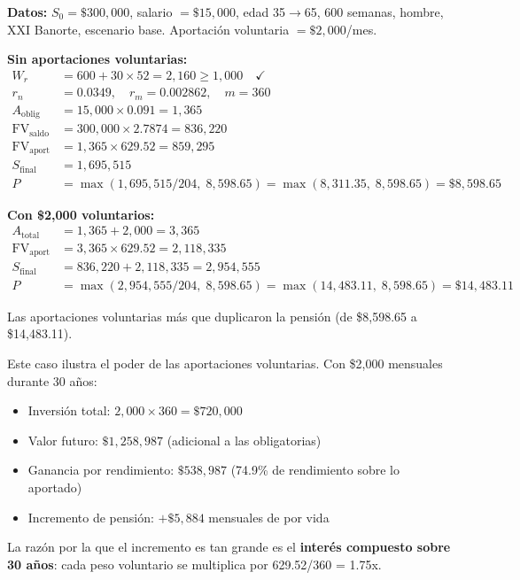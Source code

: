 \documentclass[11pt,a4paper]{report}
\theoremstyle{remark}
\DeclareMathOperator{\FV}{FV}
\begin{document}
\begin{tcolorbox}[colback=blue!5!white, colframe=blue!75!black, title=\textbf{Definici\'on Formal}]
\textbf{Datos:} $S_0 = \$300{,}000$, salario $= \$15{,}000$, edad 35$\to$65, 600 semanas, hombre, XXI Banorte, escenario base. Aportaci\'on voluntaria $= \$2{,}000$/mes.

\textbf{Sin aportaciones voluntarias:}
\begin{align}
W_r &= 600 + 30 \times 52 = 2{,}160 \geq 1{,}000 \quad \checkmark \\
r_n &= 0.0349, \quad r_m = 0.002862, \quad m = 360 \\
A_{\text{oblig}} &= 15{,}000 \times 0.091 = 1{,}365 \\
\FV_{\text{saldo}} &= 300{,}000 \times 2.7874 = 836{,}220 \\
\FV_{\text{aport}} &= 1{,}365 \times 629.52 = 859{,}295 \\
S_{\text{final}} &= 1{,}695{,}515 \\
P &= \max(1{,}695{,}515 / 204, \; 8{,}598.65) = \max(8{,}311.35, \; 8{,}598.65) = \$8{,}598.65
\end{align}

\textbf{Con \$2,000 voluntarios:}
\begin{align}
A_{\text{total}} &= 1{,}365 + 2{,}000 = 3{,}365 \\
\FV_{\text{aport}} &= 3{,}365 \times 629.52 = 2{,}118{,}335 \\
S_{\text{final}} &= 836{,}220 + 2{,}118{,}335 = 2{,}954{,}555 \\
P &= \max(2{,}954{,}555 / 204, \; 8{,}598.65) = \max(14{,}483.11, \; 8{,}598.65) = \boxed{\$14{,}483.11}
\end{align}

Las aportaciones voluntarias m\'as que duplicaron la pensi\'on (de \$8,598.65 a \$14,483.11).
\end{tcolorbox}

\begin{tcolorbox}[colback=green!5!white, colframe=green!50!black, title=\textbf{Intuici\'on}]
Este caso ilustra el poder de las aportaciones voluntarias. Con \$2,000 mensuales durante 30 a\~nos:
\begin{itemize}
  \item Inversi\'on total: $2{,}000 \times 360 = \$720{,}000$
  \item Valor futuro: $\$1{,}258{,}987$ (adicional a las obligatorias)
  \item Ganancia por rendimiento: $\$538{,}987$ (74.9\% de rendimiento sobre lo aportado)
  \item Incremento de pensi\'on: $+\$5{,}884$ mensuales de por vida
\end{itemize}

La raz\'on por la que el incremento es tan grande es el \textbf{inter\'es compuesto sobre 30 a\~nos}: cada peso voluntario se multiplica por 629.52/360 = 1.75x.
\end{tcolorbox}
\end{document}
